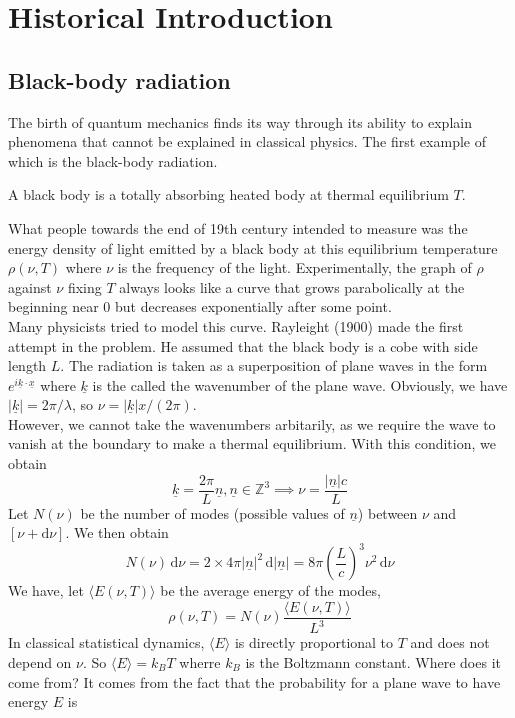 \section{Historical Introduction}
\subsection{Black-body radiation}
The birth of quantum mechanics finds its way through its ability to explain phenomena that cannot be explained in classical physics.
The first example of which is the black-body radiation.
\begin{definition}
    A black body is a totally absorbing heated body at thermal equilibrium $T$.
\end{definition}
What people towards the end of 19th century intended to measure was the energy density of light emitted by a black body at this equilibrium temperature $\rho(\nu,T)$ where $\nu$ is the frequency of the light.
Experimentally, the graph of $\rho$ against $\nu$ fixing $T$ always looks like a curve that grows parabolically at the beginning near $0$ but decreases exponentially after some point.\\
Many physicists tried to model this curve.
Rayleight (1900) made the first attempt in the problem.
He assumed that the black body is a cobe with side length $L$.
The radiation is taken as a superposition of plane waves in the form $e^{i\underline{k}\cdot\underline{x}}$ where $\underline{k}$ is the called the wavenumber of the plane wave.
Obviously, we have $|\underline{k}|=2\pi/\lambda$, so $\nu=|\underline{k}|x/(2\pi)$.\\
However, we cannot take the wavenumbers arbitarily, as we require the wave to vanish at the boundary to make a thermal equilibrium.
With this condition, we obtain
$$\underline{k}=\frac{2\pi}{L}\underline{n},\underline{n}\in\mathbb Z^3\implies \nu=\frac{|\underline{n}|c}{L}$$
Let $N(\nu)$ be the number of modes (possible values of $\underline{n}$) between $\nu$ and $[\nu+\mathrm d\nu]$.
We then obtain
$$N(\nu)\,\mathrm d\nu=2\times 4\pi|\underline{n}|^2\,\mathrm d|\underline{n}|=8\pi\left(\frac{L}{c}\right)^3\nu^2\,\mathrm d\nu$$
We have, let $\langle E(\nu,T)\rangle$ be the average energy of the modes,
$$\rho(\nu,T)=N(\nu)\frac{\langle E(\nu,T)\rangle}{L^3}$$
In classical statistical dynamics, $\langle E\rangle$ is directly proportional to $T$ and does not depend on $\nu$.
So $\langle E\rangle=k_BT$ wherre $k_B$ is the Boltzmann constant.
Where does it come from?
It comes from the fact that the probability for a plane wave to have energy $E$ is
